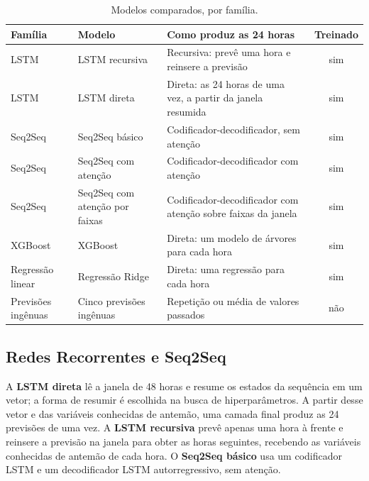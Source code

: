 \begin{table}[htbp]
    \centering
    \caption{Modelos comparados, por família.}
    \label{tab:modelos_metodologia}
    \small
    \begin{tabular}{>{\raggedright\arraybackslash}p{}>{\raggedright\arraybackslash}p{}>{\raggedright\arraybackslash}p{}c}
        \toprule
        \textbf{Família} & \textbf{Modelo} & \textbf{Como produz as 24 horas} & \textbf{Treinado} \\
        \midrule
        LSTM & LSTM recursiva & Recursiva: prevê uma hora e reinsere a previsão & sim \\
        LSTM & LSTM direta & Direta: as 24 horas de uma vez, a partir da janela resumida & sim \\
        Seq2Seq & Seq2Seq básico & Codificador-decodificador, sem atenção & sim \\
        Seq2Seq & Seq2Seq com atenção & Codificador-decodificador com atenção & sim \\
        Seq2Seq & Seq2Seq com atenção por faixas & Codificador-decodificador com atenção sobre faixas da janela & sim \\
        XGBoost & XGBoost & Direta: um modelo de árvores para cada hora & sim \\
        Regressão linear & Regressão Ridge & Direta: uma regressão para cada hora & sim \\
        Previsões ingênuas & Cinco previsões ingênuas & Repetição ou média de valores passados & não \\
        \bottomrule
    \end{tabular}
\end{table}

\subsection{Redes Recorrentes e Seq2Seq}

A \textbf{LSTM direta} lê a janela de 48 horas e resume os estados da sequência em um vetor; a forma de resumir é escolhida na busca de hiperparâmetros. A partir desse vetor e das variáveis conhecidas de antemão, uma camada final produz as 24 previsões de uma vez. A \textbf{LSTM recursiva} prevê apenas uma hora à frente e reinsere a previsão na janela para obter as horas seguintes, recebendo as variáveis conhecidas de antemão de cada hora. O \textbf{Seq2Seq básico} usa um codificador LSTM e um decodificador LSTM autorregressivo, sem atenção.

